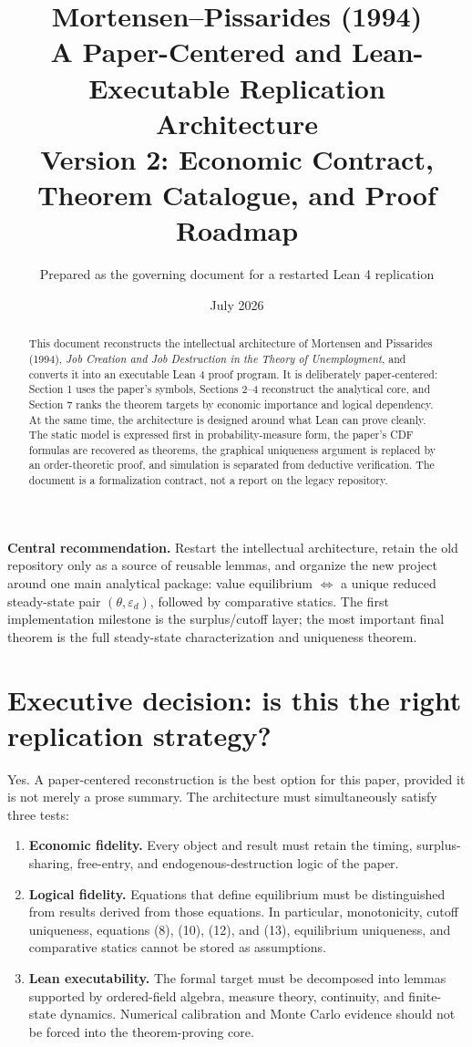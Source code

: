 \documentclass[11pt]{article}
\title{\textbf{Mortensen--Pissarides (1994)}\\[3pt]
\Large A Paper-Centered and Lean-Executable Replication Architecture\\[3pt]
\large Version 2: Economic Contract, Theorem Catalogue, and Proof Roadmap}
\author{Prepared as the governing document for a restarted Lean 4 replication}
\date{July 2026}
\newcommand{\epsd}{\varepsilon_d}
\newcommand{\statusbox}[2]{\vspace{2pt}\noindent\colorbox{#1}{\parbox{0.955\linewidth}{\small #2}}\vspace{2pt}}
\begin{document}
\maketitle

\begin{abstract}
This document reconstructs the intellectual architecture of Mortensen and Pissarides (1994), \emph{Job Creation and Job Destruction in the Theory of Unemployment}, and converts it into an executable Lean 4 proof program. It is deliberately paper-centered: Section 1 uses the paper's symbols, Sections 2--4 reconstruct the analytical core, and Section 7 ranks the theorem targets by economic importance and logical dependency. At the same time, the architecture is designed around what Lean can prove cleanly. The static model is expressed first in probability-measure form, the paper's CDF formulas are recovered as theorems, the graphical uniqueness argument is replaced by an order-theoretic proof, and simulation is separated from deductive verification. The document is a formalization contract, not a report on the legacy repository.
\end{abstract}

\statusbox{paleBlue}{\textbf{Central recommendation.} Restart the intellectual architecture, retain the old repository only as a source of reusable lemmas, and organize the new project around one main analytical package: value equilibrium $\Longleftrightarrow$ a unique reduced steady-state pair $(\theta,\epsd)$, followed by comparative statics. The first implementation milestone is the surplus/cutoff layer; the most important final theorem is the full steady-state characterization and uniqueness theorem.}

\tableofcontents
\newpage

\section*{Executive decision: is this the right replication strategy?}

Yes. A paper-centered reconstruction is the best option for this paper, provided it is not merely a prose summary. The architecture must simultaneously satisfy three tests:

\begin{enumerate}
\item \textbf{Economic fidelity.} Every object and result must retain the timing, surplus-sharing, free-entry, and endogenous-destruction logic of the paper.
\item \textbf{Logical fidelity.} Equations that define equilibrium must be distinguished from results derived from those equations. In particular, monotonicity, cutoff uniqueness, equations (8), (10), (12), and (13), equilibrium uniqueness, and comparative statics cannot be stored as assumptions.
\item \textbf{Lean executability.} The formal target must be decomposed into lemmas supported by ordered-field algebra, measure theory, continuity, and finite-state dynamics. Numerical calibration and Monte Carlo evidence should not be forced into the theorem-proving core.
\end{enumerate}
\end{document}
